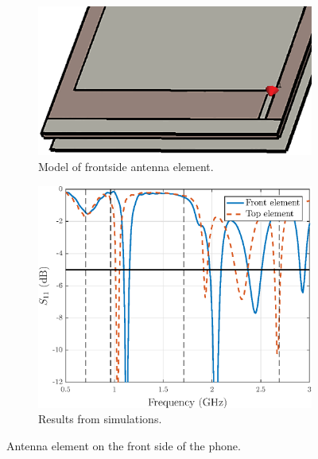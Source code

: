 \begin{figure}[H]
    \centering
    \begin{subfigure}[b]{0.49\textwidth}
        \includegraphics[width=\textwidth]{img/front.eps}
        \caption{Model of frontside antenna element.}
        \label{fig:front_model}
    \end{subfigure}
    \begin{subfigure}[b]{0.49\textwidth}
        \includegraphics[width=\textwidth]{img/front_res.eps}
        \caption{Results from simulations.}
        \label{fig:front_res}
    \end{subfigure}
    \caption{Antenna element on the front side of the phone.}
    \label{fig:front_elem}
\end{figure}

